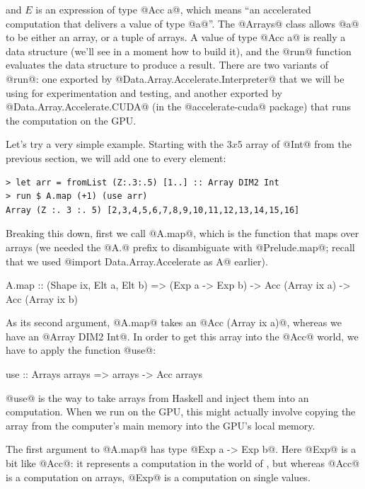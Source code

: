 \noindent and $E$ is an expression of type @Acc a@, which means ``an
accelerated computation that delivers a value of type @a@''.  The
@Arrays@ class allows @a@ to be either an array, or a tuple of
arrays. A value of type @Acc a@ is really a data structure (we'll see
in a moment how to build it), and the @run@ function evaluates the
data structure to produce a result.  There are two variants of @run@:
one exported by @Data.Array.Accelerate.Interpreter@ that we will be
using for experimentation and testing, and another exported by
@Data.Array.Accelerate.CUDA@ (in the @accelerate-cuda@ package) that
runs the computation on the GPU.

Let's try a very simple example.  Starting with the $3x5$ array of
@Int@ from the previous section, we will add one to every element:

\begin{verbatim}
> let arr = fromList (Z:.3:.5) [1..] :: Array DIM2 Int
> run $ A.map (+1) (use arr)
Array (Z :. 3 :. 5) [2,3,4,5,6,7,8,9,10,11,12,13,14,15,16]
\end{verbatim}

\noindent Breaking this down, first we call @A.map@, which is the
function that maps over arrays (we needed the @A.@ prefix to
disambiguate with @Prelude.map@; recall that we used
@import Data.Array.Accelerate as A@ earlier).

\begin{haskell}
A.map ::
  (Shape ix, Elt a, Elt b) =>
  (Exp a -> Exp b) -> Acc (Array ix a) -> Acc (Array ix b)
\end{haskell}

\noindent As its second argument, @A.map@ takes an @Acc (Array ix a)@,
whereas we have an @Array DIM2 Int@.  In order to get this array into
the @Acc@ world, we have to apply the function @use@:

\begin{haskell}
use :: Arrays arrays => arrays -> Acc arrays
\end{haskell}

\noindent @use@ is the way to take arrays from Haskell and inject them
into an \acc{} computation.  When we run on the GPU, this might
actually involve copying the array from the computer's main memory
into the GPU's local memory.

The first argument to @A.map@ has type @Exp a -> Exp b@.  Here @Exp@
is a bit like @Acc@: it represents a computation in the world of
\acc{}, but whereas @Acc@ is a computation on arrays, @Exp@ is a
computation on single values.

